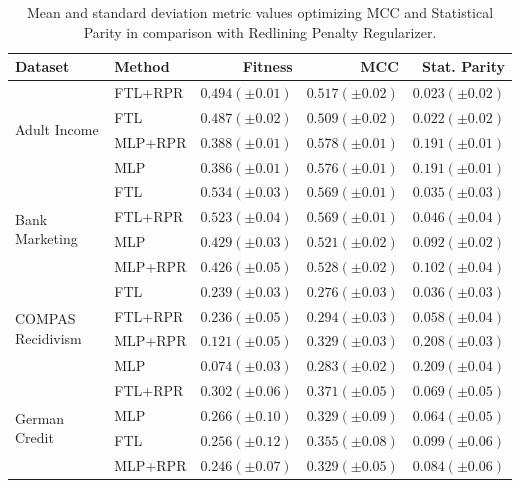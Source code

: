 \begin{table}
    \centering
    \caption{Mean and standard deviation metric values optimizing MCC and Statistical Parity in comparison with Redlining Penalty Regularizer.}\label{tab:complete_mcc_parity_rpr}
    {\footnotesize\begin{tabular}{llrrr}
    \toprule
    Dataset & Method & Fitness & MCC & Stat. Parity \\
    \midrule

    \multirow[t]{4}{*}{Adult Income} & FTL+RPR & $0.494 (\pm0.01)$ & $0.517 (\pm0.02)$ & $0.023 (\pm0.02)$ \\
     & FTL & $0.487 (\pm0.02)$ & $0.509 (\pm0.02)$ & $0.022 (\pm0.02)$ \\
     & MLP+RPR & $0.388 (\pm0.01)$ & $0.578 (\pm0.01)$ & $0.191 (\pm0.01)$ \\
     & MLP & $0.386 (\pm0.01)$ & $0.576 (\pm0.01)$ & $0.191 (\pm0.01)$ \\
    \midrule
    \multirow[t]{4}{*}{Bank Marketing} & FTL & $0.534 (\pm0.03)$ & $0.569 (\pm0.01)$ & $0.035 (\pm0.03)$ \\
     & FTL+RPR & $0.523 (\pm0.04)$ & $0.569 (\pm0.01)$ & $0.046 (\pm0.04)$ \\
     & MLP & $0.429 (\pm0.03)$ & $0.521 (\pm0.02)$ & $0.092 (\pm0.02)$ \\
     & MLP+RPR & $0.426 (\pm0.05)$ & $0.528 (\pm0.02)$ & $0.102 (\pm0.04)$ \\
    \midrule
    \multirow[t]{4}{*}{COMPAS Recidivism} & FTL & $0.239 (\pm0.03)$ & $0.276 (\pm0.03)$ & $0.036 (\pm0.03)$ \\
     & FTL+RPR & $0.236 (\pm0.05)$ & $0.294 (\pm0.03)$ & $0.058 (\pm0.04)$ \\
     & MLP+RPR & $0.121 (\pm0.05)$ & $0.329 (\pm0.03)$ & $0.208 (\pm0.03)$ \\
     & MLP & $0.074 (\pm0.03)$ & $0.283 (\pm0.02)$ & $0.209 (\pm0.04)$ \\
    \midrule
    \multirow[t]{4}{*}{German Credit} & FTL+RPR & $0.302 (\pm0.06)$ & $0.371 (\pm0.05)$ & $0.069 (\pm0.05)$ \\
     & MLP & $0.266 (\pm0.10)$ & $0.329 (\pm0.09)$ & $0.064 (\pm0.05)$ \\
     & FTL & $0.256 (\pm0.12)$ & $0.355 (\pm0.08)$ & $0.099 (\pm0.06)$ \\
     & MLP+RPR & $0.246 (\pm0.07)$ & $0.329 (\pm0.05)$ & $0.084 (\pm0.06)$ \\
     \bottomrule
\end{tabular}}
\end{table}

